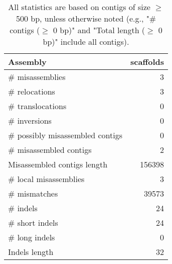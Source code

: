 \documentclass[12pt,a4paper]{article}
\begin{document}
\begin{table}[ht]
\begin{center}
\caption{All statistics are based on contigs of size $\geq$ 500 bp, unless otherwise noted (e.g., "\# contigs ($\geq$ 0 bp)" and "Total length ($\geq$ 0 bp)" include all contigs).}
\begin{tabular}{|l*{1}{|r}|}
\hline
Assembly & scaffolds \\ \hline
\# misassemblies & 3 \\ \hline
\hspace{5mm}\# relocations & 3 \\ \hline
\hspace{5mm}\# translocations & 0 \\ \hline
\hspace{5mm}\# inversions & 0 \\ \hline
\# possibly misassembled contigs & 0 \\ \hline
\# misassembled contigs & 2 \\ \hline
Misassembled contigs length & 156398 \\ \hline
\# local misassemblies & 3 \\ \hline
\# mismatches & 39573 \\ \hline
\# indels & 24 \\ \hline
\hspace{5mm}\# short indels & 24 \\ \hline
\hspace{5mm}\# long indels & 0 \\ \hline
Indels length & 32 \\ \hline
\end{tabular}
\end{center}
\end{table}
\end{document}
